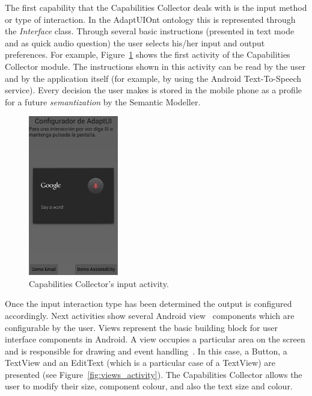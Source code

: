 The first capability that the Capabilities Collector deals with is the input
method or type of interaction. In the AdaptUIOnt ontology this is represented
through the \textit{Interface} class. Through several basic instructions
(presented in text mode and as quick audio question) the user selects his/her
input and output preferences. For example, Figure~\ref{fig:input_activity} shows
the first activity of the Capabilities Collector module. The instructions shown
in this activity can be read by the user and by the application itself (for
example, by using the Android Text-To-Speech~\citep{tts} service). Every decision
the user makes is stored in the mobile phone as a profile for a future
\textit{semantization} by the Semantic Modeller.

\begin{figure}
\centering
\includegraphics[width=0.35\textwidth]{input_activity.png}
\caption{Capabilities Collector's input activity.}
\label{fig:input_activity}
\end{figure}

Once the input interaction type has been determined the output is configured 
accordingly. Next activities show several Android view~\citep{android_view} 
components which are configurable by the user. Views represent the basic 
building block for user interface components in Android. A view occupies a 
particular area on the screen and is responsible for drawing and event 
handling~\citep{android_view}. In this case, a Button, a TextView and an 
EditText (which is a particular case of a TextView) are presented (see 
Figure~\ref{fig:views_activity}). The Capabilities Collector allows the user to 
modify their size, component colour, and also the text size and colour.

